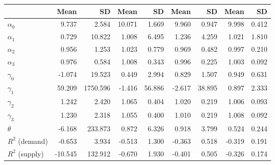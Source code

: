 
\begin{tabular}[t]{lrrrrrrrr}
\toprule
  & Mean & SD & Mean  & SD  & Mean   & SD   & Mean    & SD   \\
\midrule
$\alpha_{0}$ & 9.737 & 2.584 & 10.071 & 1.669 & 9.960 & 0.947 & 9.998 & 0.412\\
$\alpha_{1}$ & 0.729 & 10.822 & 1.008 & 6.495 & 1.236 & 4.259 & 1.021 & 1.810\\
$\alpha_{2}$ & 0.956 & 1.253 & 1.023 & 0.779 & 0.969 & 0.482 & 0.997 & 0.210\\
$\alpha_{3}$ & 0.976 & 0.584 & 1.008 & 0.343 & 0.996 & 0.225 & 1.003 & 0.092\\
$\gamma_{0}$ & -1.074 & 19.523 & 0.449 & 2.994 & 0.829 & 1.507 & 0.949 & 0.631\\
$\gamma_{1}$ & 59.209 & 1750.596 & -1.416 & 56.886 & -2.617 & 38.895 & 0.897 & 2.333\\
$\gamma_{2}$ & 1.242 & 2.420 & 1.065 & 0.404 & 1.020 & 0.219 & 1.006 & 0.093\\
$\gamma_{3}$ & 1.230 & 2.318 & 1.055 & 0.400 & 1.010 & 0.219 & 1.008 & 0.092\\
$\theta$ & -6.168 & 233.873 & 0.872 & 6.326 & 0.918 & 3.799 & 0.524 & 0.244\\
$R^{2}$ (demand) & -0.653 & 3.934 & -0.513 & 1.300 & -0.363 & 0.518 & -0.319 & 0.191\\
$R^{2}$ (supply) & -10.545 & 132.912 & -0.670 & 1.930 & -0.401 & 0.505 & -0.326 & 0.174\\
\bottomrule
\end{tabular}
